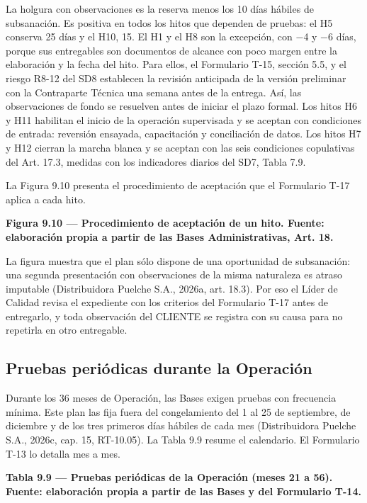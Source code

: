 La holgura con observaciones es la reserva menos los 10 días hábiles de subsanación. Es positiva en todos los hitos que dependen de pruebas: el H5 conserva 25 días y el H10, 15. El H1 y el H8 son la excepción, con −4 y −6 días, porque sus entregables son documentos de alcance con poco margen entre la elaboración y la fecha del hito. Para ellos, el Formulario T-15, sección 5.5, y el riesgo R8-12 del SD8 establecen la revisión anticipada de la versión preliminar con la Contraparte Técnica una semana antes de la entrega. Así, las observaciones de fondo se resuelven antes de iniciar el plazo formal. Los hitos H6 y H11 habilitan el inicio de la operación supervisada y se aceptan con condiciones de entrada: reversión ensayada, capacitación y conciliación de datos. Los hitos H7 y H12 cierran la marcha blanca y se aceptan con las seis condiciones copulativas del Art. 17.3, medidas con los indicadores diarios del SD7, Tabla 7.9.

La Figura 9.10 presenta el procedimiento de aceptación que el Formulario T-17 aplica a cada hito.



\textbf{Figura 9.10 — Procedimiento de aceptación de un hito. Fuente: elaboración propia a partir de las Bases Administrativas, Art. 18.}

La figura muestra que el plan sólo dispone de una oportunidad de subsanación: una segunda presentación con observaciones de la misma naturaleza es atraso imputable (Distribuidora Puelche S.A., 2026a, art. 18.3). Por eso el Líder de Calidad revisa el expediente con los criterios del Formulario T-17 antes de entregarlo, y toda observación del CLIENTE se registra con su causa para no repetirla en otro entregable.

\subsection{Pruebas periódicas durante la Operación}

Durante los 36 meses de Operación, las Bases exigen pruebas con frecuencia mínima. Este plan las fija fuera del congelamiento del 1 al 25 de septiembre, de diciembre y de los tres primeros días hábiles de cada mes (Distribuidora Puelche S.A., 2026c, cap. 15, RT-10.05). La Tabla 9.9 resume el calendario. El Formulario T-13 lo detalla mes a mes.

\textbf{Tabla 9.9 — Pruebas periódicas de la Operación (meses 21 a 56). Fuente: elaboración propia a partir de las Bases y del Formulario T-14.}

